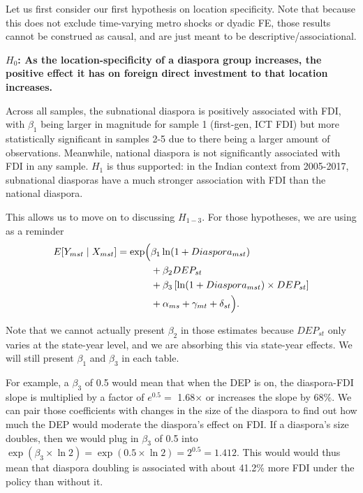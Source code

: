 \documentclass[doublespace,nopageskip]{UVAthesis}
\begin{document}
Let us first consider our first hypothesis on location specificity. Note that because this does not exclude time-varying metro shocks or dyadic FE, those results cannot be construed as causal, and are just meant to be descriptive/associational.

\textbf{$H_0$: As the location-specificity of a diaspora group increases, the positive effect it has on foreign direct investment to that location increases.}



Across all samples, the subnational diaspora is positively associated with FDI, with $\beta_1$ being larger in magnitude for sample 1 (first-gen, ICT FDI) but more statistically significant in samples 2-5 due to there being a larger amount of observations.  Meanwhile, national diaspora is not significantly associated with FDI in any sample. $H_1$ is thus supported: in the Indian context from 2005-2017, subnational diasporas have a much stronger association with FDI than the national diaspora.

This allows us to move on to discussing $H_{1-3}$. For those hypotheses, we are using as a reminder \[
\begin{aligned}
E[Y_{mst} \mid X_{mst}] =
\exp \Bigl(
&\beta_1 \ln(1+Diaspora_{mst}) \\
&+ \beta_2 DEP_{st} \\
&+ \beta_3 \left[\ln(1+Diaspora_{mst}) \times DEP_{st}\right] \\
&+ \alpha_{ms}
+ \gamma_{mt}
+ \delta_{st}
\Bigr).
\end{aligned}
\]

Note that we cannot actually present $\beta_2$ in those estimates because $DEP_{st}$ only varies at the state-year level, and we are absorbing this via state-year effects. We will still present $\beta_1$ and $\beta_3$ in each table. 

For example, a $\beta_3$ of 0.5 would mean that when the DEP is on, the diaspora-FDI slope is multiplied by a factor of $e^{0.5} = $ 1.68$\times$ or increases the slope by 68\%. We can pair those coefficients with changes in the size of the diaspora to find out how much the DEP would moderate the diaspora's effect on FDI. If a diaspora's size doubles, then we would plug in $\beta_3$ of 0.5 into $\exp(\beta_3​×\ln2) = \exp(0.5\times\ln2) =2^{0.5} = 1.412 $. This would would thus mean that diaspora doubling is associated with about 41.2\% more FDI under the policy than without it.
\end{document}
